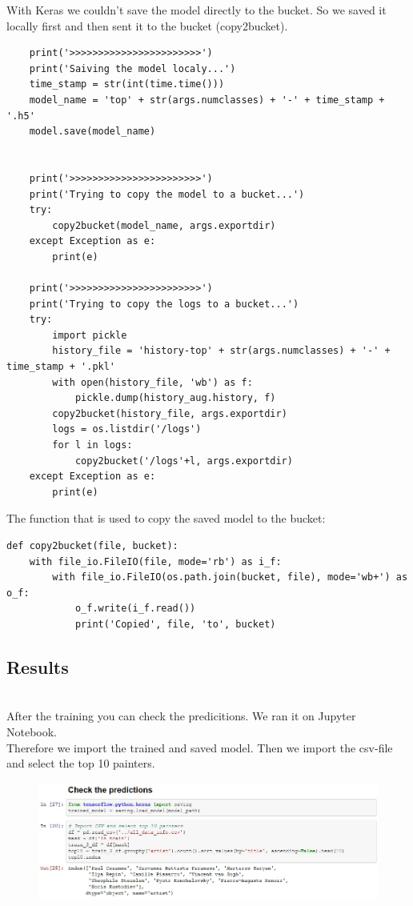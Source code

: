 \documentclass[
	12pt, %
]{fphw}
\begin{document}
\noindent With Keras we couldn't save the model directly to the bucket. So we saved it locally first and then sent it to the bucket (copy2bucket). 
\begin{lstlisting}
    print('>>>>>>>>>>>>>>>>>>>>>>>')
    print('Saiving the model localy...')
    time_stamp = str(int(time.time()))
    model_name = 'top' + str(args.numclasses) + '-' + time_stamp + '.h5'
    model.save(model_name)
    

    print('>>>>>>>>>>>>>>>>>>>>>>>')
    print('Trying to copy the model to a bucket...')
    try:
        copy2bucket(model_name, args.exportdir)
    except Exception as e: 
        print(e)
    
    print('>>>>>>>>>>>>>>>>>>>>>>>')
    print('Trying to copy the logs to a bucket...')
    try:
        import pickle
        history_file = 'history-top' + str(args.numclasses) + '-' + time_stamp + '.pkl'
        with open(history_file, 'wb') as f:
            pickle.dump(history_aug.history, f)
        copy2bucket(history_file, args.exportdir)
        logs = os.listdir('/logs')
        for l in logs:
            copy2bucket('/logs'+l, args.exportdir)
    except Exception as e: 
        print(e)
\end{lstlisting}

\noindent The function that is used to copy  the saved model to the bucket:
\begin{lstlisting}
def copy2bucket(file, bucket):
    with file_io.FileIO(file, mode='rb') as i_f:
        with file_io.FileIO(os.path.join(bucket, file), mode='wb+') as o_f:
            o_f.write(i_f.read())
            print('Copied', file, 'to', bucket)
\end{lstlisting}

\subsection*{Results}
\ \\ 

\noindent After the training you can check the predicitions. We ran it on Jupyter Notebook. \\
Therefore we import the trained and saved model. Then we import the csv-file and select the top 10 painters.\\
\begin{figure}[H]
	\includegraphics[width=1\textwidth]{Check1.jpg}
\end{figure}
\end{document}
